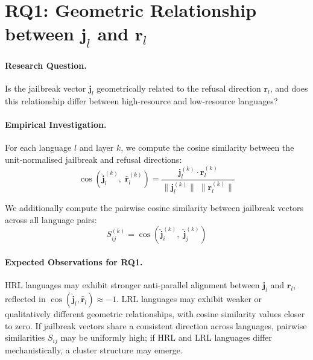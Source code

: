 \section{RQ1: Geometric Relationship between \texorpdfstring{$\mathbf{j}_l$}{j\_l} and \texorpdfstring{$\mathbf{r}_l$}{r\_l}}
\label{sec:rq1}

\paragraph{Research Question.}
Is the jailbreak vector $\mathbf{j}_l$ geometrically related to the refusal direction $\mathbf{r}_l$, and does this relationship differ between high-resource and low-resource languages?

\paragraph{Empirical Investigation.}
For each language $l$ and layer $k$, we compute the cosine similarity between the unit-normalised jailbreak and refusal directions:
%
\begin{equation}
    \cos\!\left(\hat{\mathbf{j}}_l^{(k)},\; \hat{\mathbf{r}}_l^{(k)}\right)
    = \frac{\mathbf{j}_l^{(k)} \cdot \mathbf{r}_l^{(k)}}
           {\|\mathbf{j}_l^{(k)}\|\;\|\mathbf{r}_l^{(k)}\|}
    \label{eq:cos_jl_rl}
\end{equation}

We additionally compute the pairwise cosine similarity between jailbreak vectors across all language pairs:
%
\begin{equation}
    S_{ij}^{(k)} = \cos\!\left(\hat{\mathbf{j}}_i^{(k)},\; \hat{\mathbf{j}}_j^{(k)}\right)
    \label{eq:cross_sim}
\end{equation}

\paragraph{Expected Observations for RQ1.}
HRL languages may exhibit stronger anti-parallel alignment between $\mathbf{j}_l$ and $\mathbf{r}_l$, reflected in $\cos(\hat{\mathbf{j}}_l, \hat{\mathbf{r}}_l) \approx -1$. LRL languages may exhibit weaker or qualitatively different geometric relationships, with cosine similarity values closer to zero. If jailbreak vectors share a consistent direction across languages, pairwise similarities $S_{ij}$ may be uniformly high; if HRL and LRL languages differ mechanistically, a cluster structure may emerge.

